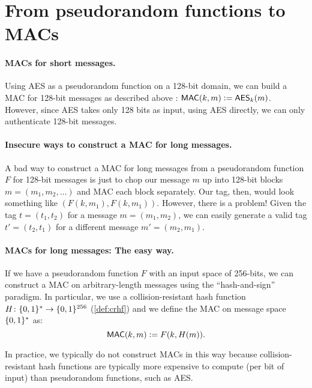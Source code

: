 \section{From pseudorandom functions to MACs}

\paragraph{MACs for short messages.}
Using AES as a pseudorandom function on a 128-bit domain,
we can build a MAC for 128-bit messages as described above
: $\mathsf{MAC}(k, m) \mathrel{\mathop:}= \mathsf{AES}_k(m)$. 
However, since AES takes only 128 bits as input, using AES
directly, we can only authenticate 128-bit messages. 

\paragraph{Insecure ways to construct a MAC for long messages.}
A bad way to construct a MAC for long messages from a pseudorandom 
function $F$ for 128-bit messages is
just to chop our message $m$ up into 128-bit blocks
$m = (m_1, m_2, \dots)$
and MAC each block separately.
Our tag, then, would look something like $\left(F(k,m_1), F(k,m_1)\right)$.
However, there is a problem! Given the tag $t = (t_1, t_2)$ for a message $m=(m_1, m_2)$, we can easily generate a valid tag 
$t' = (t_2, t_1)$ for a different message $m'=(m_2, m_1)$. 

\paragraph{MACs for long messages: The easy way.}
If we have a pseudorandom function $F$ with an input space of 256-bits,
we can construct a MAC on arbitrary-length messages using the ``hash-and-sign'' paradigm.
In particular, we use a collision-resistant hash function $H\colon \{0,1\}^* \to \{0,1\}^{256}$ 
(\cref{def:crhf}) and we define the MAC on message space $\{0,1\}^*$ as:
\[ \mathsf{MAC}(k,m) \mathrel{\mathop:}= F(k, H(m)).\]


In practice, we typically do not construct MACs in this way because
collision-resistant hash functions are typically more expensive to
compute (per bit of input) than pseudorandom functions, such as AES.


